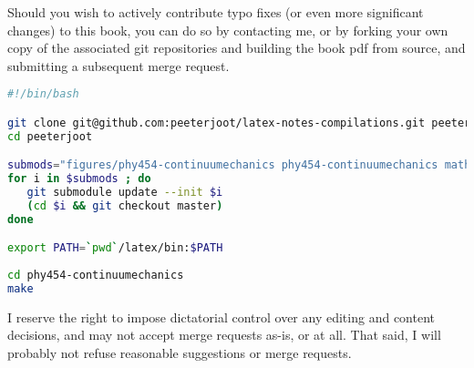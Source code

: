 %
%

Should you wish to actively contribute typo fixes (or even more significant changes) to this book, you can do so by contacting me, or by forking your own copy of the associated git repositories and building the book pdf from source, and submitting a subsequent merge request.

\begin{lstlisting}[language=bash]
#!/bin/bash

git clone git@github.com:peeterjoot/latex-notes-compilations.git peeterjoot
cd peeterjoot

submods="figures/phy454-continuumechanics phy454-continuumechanics mathematica latex"
for i in $submods ; do
   git submodule update --init $i
   (cd $i && git checkout master)
done

export PATH=`pwd`/latex/bin:$PATH
 
cd phy454-continuumechanics
make
\end{lstlisting}

I reserve the right to impose dictatorial control over any editing and content decisions, and may not accept merge requests as-is, or at all. That said, I will probably not refuse reasonable suggestions or merge requests.
